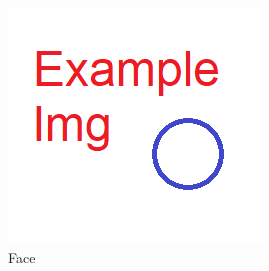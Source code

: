 \documentclass[
]{book}
\begin{document}
\begin{figure}[H]

{\centering \includegraphics[width=0.75\linewidth]{articles/how-to-install-xyz/Example Graphic} 

}

\caption{Face}\label{fig:unnamed-chunk-7}
\end{figure}

  
\end{document}
